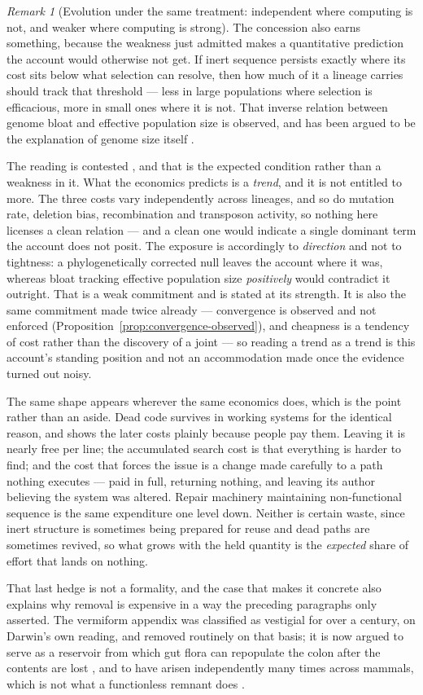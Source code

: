 \documentclass[11pt,a4paper]{article}
\theoremstyle{remark}\newtheorem{remark}[definition]{Remark}
\begin{document}
\begin{remark}[Evolution under the same treatment: independent where computing is not, and weaker where computing is strong]
The concession also earns something, because the weakness just admitted makes a quantitative
prediction the account would otherwise not get. If inert sequence persists exactly where its cost sits
below what selection can resolve, then how much of it a lineage carries should track that threshold
--- less in large populations where selection is efficacious, more in small ones where it is not. That
inverse relation between genome bloat and effective population size is observed, and has been argued
to be the explanation of genome size itself \citep{lynch2003}.

The reading is contested \citep{whitney2010}, and that is the expected condition rather than a
weakness in it. What the economics predicts is a \emph{trend}, and it is not entitled to more. The
three costs vary independently across lineages, and so do mutation rate, deletion bias, recombination
and transposon activity, so nothing here licenses a clean relation --- and a clean one would indicate
a single dominant term the account does not posit. The exposure is accordingly to \emph{direction} and
not to tightness: a phylogenetically corrected null leaves the account where it was, whereas bloat
tracking effective population size \emph{positively} would contradict it outright. That is a weak
commitment and is stated at its strength. It is also the same commitment made twice already ---
convergence is observed and not enforced (Proposition~\ref{prop:convergence-observed}), and cheapness
is a tendency of cost rather than the discovery of a joint --- so reading a trend as a trend is this
account's standing position and not an accommodation made once the evidence turned out noisy.

The same shape appears wherever the same economics does, which is the point rather than an aside.
Dead code survives in working systems for the identical reason, and shows the later costs plainly
because people pay them. Leaving it is nearly free per line; the accumulated search cost is that
everything is harder to find; and the cost that forces the issue is a change made carefully to a path
nothing executes --- paid in full, returning nothing, and leaving its author believing the system was
altered. Repair machinery maintaining non-functional sequence is the same expenditure one level down.
Neither is certain waste, since inert structure is sometimes being prepared for reuse and dead paths
are sometimes revived, so what grows with the held quantity is the \emph{expected} share of effort
that lands on nothing.

That last hedge is not a formality, and the case that makes it concrete also explains why removal is
expensive in a way the preceding paragraphs only asserted. The vermiform appendix was classified as
vestigial for over a century, on Darwin's own reading, and removed routinely on that basis; it is now
argued to serve as a reservoir from which gut flora can repopulate the colon after the contents are
lost \citep{bollinger2007}, and to have arisen independently many times across mammals, which is not
what a functionless remnant does \citep{smith2013}.


\end{remark}
\end{document}
